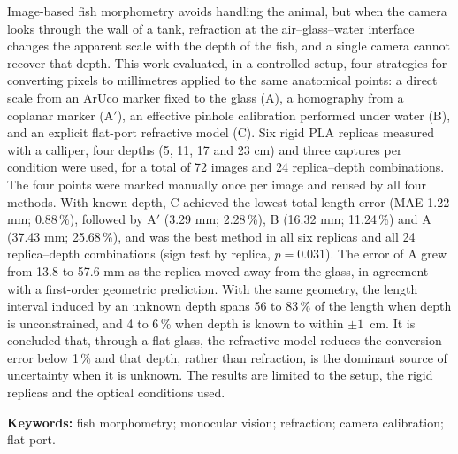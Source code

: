 \documentclass{report}
\newcommand{\Aprime}{A$'$}
\newcommand{\Keywords}{fish morphometry; monocular vision; refraction; camera calibration; flat port}
\begin{document}
Image-based fish morphometry avoids handling the animal, but when the camera looks through the wall of a tank, refraction at the air--glass--water interface changes the apparent scale with the depth of the fish, and a single camera cannot recover that depth. This work evaluated, in a controlled setup, four strategies for converting pixels to millimetres applied to the same anatomical points: a direct scale from an ArUco marker fixed to the glass (A), a homography from a coplanar marker (\Aprime), an effective pinhole calibration performed under water (B), and an explicit flat-port refractive model (C). Six rigid PLA replicas measured with a calliper, four depths (5, 11, 17 and 23 cm) and three captures per condition were used, for a total of 72 images and 24 replica--depth combinations. The four points were marked manually once per image and reused by all four methods. With known depth, C achieved the lowest total-length error (MAE 1.22 mm; 0.88\,\%), followed by \Aprime{} (3.29 mm; 2.28\,\%), B (16.32 mm; 11.24\,\%) and A (37.43 mm; 25.68\,\%), and was the best method in all six replicas and all 24 replica--depth combinations (sign test by replica, $p = 0.031$). The error of A grew from 13.8 to 57.6 mm as the replica moved away from the glass, in agreement with a first-order geometric prediction. With the same geometry, the length interval induced by an unknown depth spans 56 to 83\,\% of the length when depth is unconstrained, and 4 to 6\,\% when depth is known to within $\pm 1$~cm. It is concluded that, through a flat glass, the refractive model reduces the conversion error below 1\,\% and that depth, rather than refraction, is the dominant source of uncertainty when it is unknown. The results are limited to the setup, the rigid replicas and the optical conditions used.

\noindent\textbf{Keywords:} \Keywords.
\end{document}
